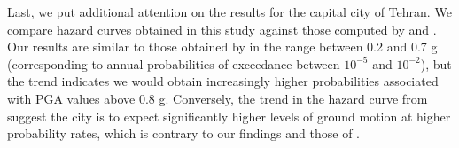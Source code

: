 Last, we put additional attention on the results for the capital city of Tehran. We compare hazard curves obtained in this study against those computed by \citet{Ghodrati2003} and \citet{Boostan2015}. Our results are similar to those obtained by \citet{Ghodrati2003} in the range between 0.2 and 0.7 g (corresponding to annual probabilities of exceedance between $10^{-5}$ and $10^{-2}$), but the trend indicates we would obtain increasingly higher probabilities associated with PGA values above 0.8 g. Conversely, the trend in the hazard curve from \citet{Boostan2015} suggest the city is to expect significantly higher levels of ground motion at higher probability rates, which is contrary to our findings and those of \citet{Ghodrati2003}.
